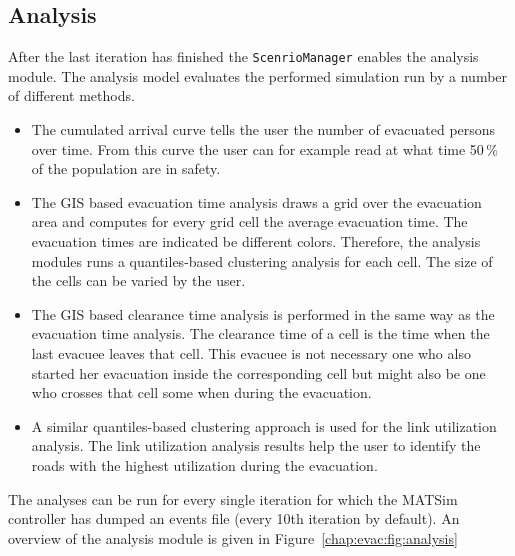 \subsection{Analysis}
After the last iteration has finished the \lstinline+ScenrioManager+ enables the analysis module. The analysis model evaluates the performed simulation run by a number of different methods. 
\begin{itemize}
\item The cumulated arrival curve tells the user the number of evacuated persons over time. From this curve the user can for example read at what time 50\,\% of the population are in safety.
\item The GIS based evacuation time analysis draws a grid over the evacuation area and computes for every grid cell the average evacuation time. The evacuation times are indicated be different colors. Therefore, the analysis modules runs a quantiles-based clustering analysis for each cell. The size of the cells can be varied  by the user.
\item The GIS based clearance time analysis is performed in the same way as the evacuation time  analysis. The clearance time of a cell is the time when the last evacuee leaves that cell. This evacuee is not necessary one who also started her evacuation inside the corresponding cell but might also be one who crosses that cell some when during the evacuation.
\item A similar quantiles-based clustering approach is used for the link utilization analysis. The link utilization analysis results help the user to identify the roads with the highest utilization during the evacuation.
\end{itemize}
The analyses can be run for every single iteration for which the MATSim controller has dumped an events file (every 10th iteration by default). An overview of the analysis module is given in Figure~\ref{chap:evac:fig:analysis}

